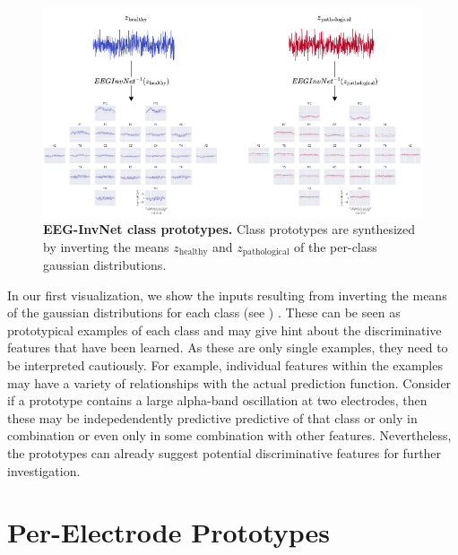 \begin{figure}[htb]
    \myfloatalign
    \includegraphics[width=1\linewidth]{images/EEGInvNetClassPrototypes.png}
    \caption[EEG-InvNet class prototypes]{
\textbf{EEG-InvNet class prototypes.} Class prototypes are synthesized
by inverting the means $z_\mathrm{healthy}$ and
$z_\mathrm{pathological}$ of the per-class gaussian distributions.
}
\label{eeg-prototypes-fig}
\end{figure}

    In our first visualization, we show the inputs resulting from inverting
the means of the gaussian distributions for each class (see
) . These can be seen as
prototypical examples of each class and may give hint about the
discriminative features that have been learned. As these are only single
examples, they need to be interpreted cautiously. For example,
individual features within the examples may have a variety of
relationships with the actual prediction function. Consider if a
prototype contains a large alpha-band oscillation at two electrodes,
then these may be indepedendently predictive predictive of that class or
only in combination or even only in some combination with other
features. Nevertheless, the prototypes can already suggest potential
discriminative features for further investigation.

\section{Per-Electrode Prototypes}\label{per-electrode-prototypes}
    

